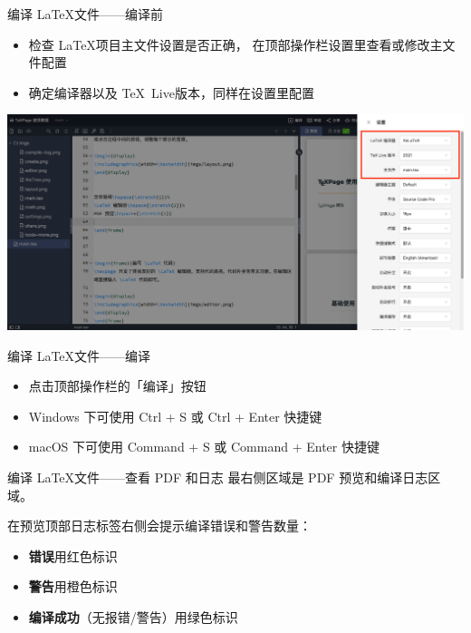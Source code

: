 \documentclass{beamer}
\DeclareRobustCommand\texlive{\TeX\ Live}
\newenvironment{display}{\trivlist\item[]}{\endtrivlist}
\begin{document}
\begin{frame}{编译 \LaTeX 文件\hfill ——编译前}
\begin{itemize}
\item 检查 \LaTeX 项目主文件设置是否正确，
在顶部操作栏设置里查看或修改主文件配置
\item 确定编译器以及 \texlive 版本，同样在设置里配置
\end{itemize}

\begin{display}
\includegraphics[width=\textwidth]{imgs/settings.png}
\end{display}
\end{frame}



\begin{frame}{编译 \LaTeX 文件\hfill ——编译}
\begin{itemize}
\item 点击顶部操作栏的「编译」按钮
\item Windows 下可使用 Ctrl + S 或 Ctrl + Enter 快捷键
\item macOS 下可使用 Command + S 或 Command + Enter 快捷键
\end{itemize}
\end{frame}



\begin{frame}{编译 \LaTeX 文件\hfill ——查看 PDF 和日志}
最右侧区域是 PDF 预览和编译日志区域。

在预览顶部日志标签右侧会提示编译错误和警告数量：
\begin{itemize}
\item \textbf{\color{red}错误}用红色标识
\item \textbf{\color{orange}警告}用橙色标识
\item \textbf{\color{green!80!black}编译成功}（无报错/警告）用绿色标识
\end{itemize}

\end{frame}
\end{document}
